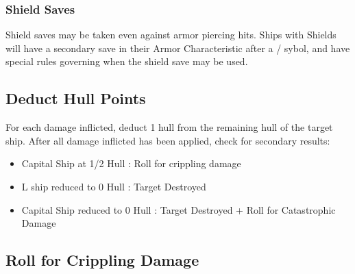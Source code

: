 \subsubsection{Shield Saves}
Shield saves may be taken even against armor piercing hits. Ships with Shields will have a secondary save in their Armor Characteristic after a / sybol, and have special rules governing when the shield save may be used.

\subsection{Deduct Hull Points}
For each damage inflicted, deduct 1 hull from the remaining hull of the target ship. After all damage inflicted has been applied, check for secondary results:
\begin{itemize}
	\item Capital Ship at 1/2 Hull : Roll for crippling damage
	\item L ship reduced to 0 Hull : Target Destroyed
	\item Capital Ship reduced to 0 Hull : Target Destroyed + Roll for Catastrophic Damage
\end{itemize}

\subsection{Roll for Crippling Damage}

